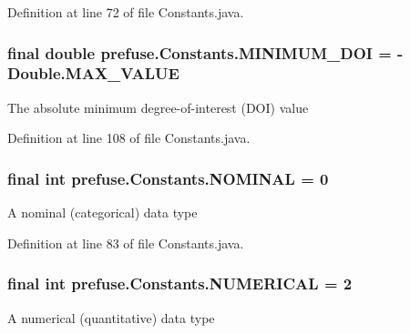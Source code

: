 \-Definition at line 72 of file \-Constants.\-java.

\hypertarget{interfaceprefuse_1_1_constants_aba9f6777a5d4c6666073b4280e7fc8d8}{
\subsubsection[{\-M\-I\-N\-I\-M\-U\-M\-\_\-\-D\-O\-I}]{\setlength{\rightskip}{0pt plus 5cm}final double {\bf prefuse.\-Constants.\-M\-I\-N\-I\-M\-U\-M\-\_\-\-D\-O\-I} = -\/\-Double.\-M\-A\-X\-\_\-\-V\-A\-L\-U\-E}}\label{interfaceprefuse_1_1_constants_aba9f6777a5d4c6666073b4280e7fc8d8}
\-The absolute minimum degree-\/of-\/interest (\-D\-O\-I) value 

\-Definition at line 108 of file \-Constants.\-java.

\hypertarget{interfaceprefuse_1_1_constants_abc57a9bb50302e46274bb174392bb2e9}{
\subsubsection[{\-N\-O\-M\-I\-N\-A\-L}]{\setlength{\rightskip}{0pt plus 5cm}final int {\bf prefuse.\-Constants.\-N\-O\-M\-I\-N\-A\-L} = 0}}\label{interfaceprefuse_1_1_constants_abc57a9bb50302e46274bb174392bb2e9}
\-A nominal (categorical) data type 

\-Definition at line 83 of file \-Constants.\-java.

\hypertarget{interfaceprefuse_1_1_constants_a1202927c3386b9bd213fe8bba07cb158}{
\subsubsection[{\-N\-U\-M\-E\-R\-I\-C\-A\-L}]{\setlength{\rightskip}{0pt plus 5cm}final int {\bf prefuse.\-Constants.\-N\-U\-M\-E\-R\-I\-C\-A\-L} = 2}}\label{interfaceprefuse_1_1_constants_a1202927c3386b9bd213fe8bba07cb158}
\-A numerical (quantitative) data type 

